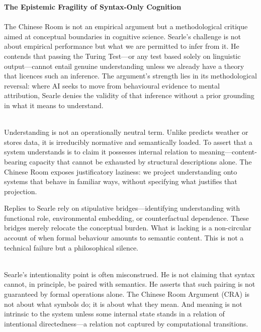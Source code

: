 \begin{technical}
{\Large\textbf{The Epistemic Fragility of Syntax-Only Cognition}}\\[0.3em]

\\[0.5em]
The Chinese Room is not an empirical argument but a methodological critique aimed at conceptual boundaries in cognitive science. Searle's challenge is not about empirical performance but what we are permitted to infer from it. He contends that passing the Turing Test—or any test based solely on linguistic output—cannot entail genuine understanding unless we already have a theory that licences such an inference. The argument's strength lies in its methodological reversal: where AI seeks to move from behavioural evidence to mental attribution, Searle denies the validity of that inference without a prior grounding in what it means to \QSOpen{}understand.\QSClose{}

\\[0.5em]
\QSOpen{}Understanding\QSClose{} is not an operationally neutral term. Unlike \QSOpen{}predicts weather\QSClose{} or \QSOpen{}stores data,\QSClose{} it is irreducibly normative and semantically loaded. To assert that a system understands is to claim it possesses internal relation to meaning—content-bearing capacity that cannot be exhausted by structural descriptions alone. The Chinese Room exposes justificatory laziness: we project understanding onto systems that behave in familiar ways, without specifying what justifies that projection.

Replies to Searle rely on stipulative bridges—identifying understanding with functional role, environmental embedding, or counterfactual dependence. These bridges merely relocate the conceptual burden. What is lacking is a non-circular account of when formal behaviour amounts to semantic content. This is not a technical failure but a philosophical silence.

\\[0.5em]
Searle's intentionality point is often misconstrued. He is not claiming that syntax cannot, in principle, be paired with semantics. He asserts that such pairing is not guaranteed by formal operations alone. The Chinese Room Argument (CRA) is not about what symbols do; it is about what they mean. And meaning is not intrinsic to the system unless some internal state stands in a relation of intentional directedness—a relation not captured by computational transitions.


\end{technical}
